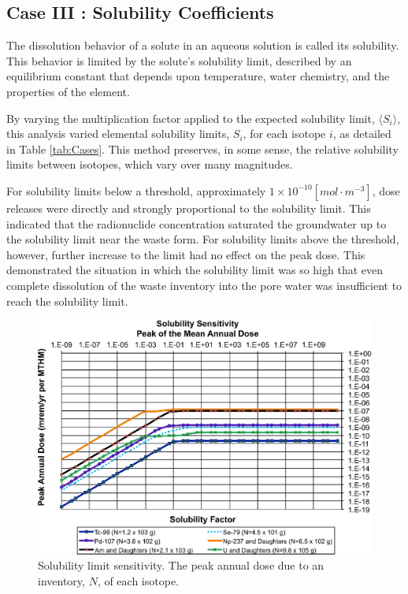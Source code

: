 
\subsection{Case III : Solubility Coefficients}

The dissolution behavior of a solute in an aqueous solution is called its 
solubility. This behavior is limited by the solute's solubility limit, described  
by an equilibrium constant that depends upon temperature, water chemistry, and 
the properties of the element. 

By varying the multiplication factor applied to the expected solubility limit, 
$\langle S_i\rangle$, this analysis varied elemental solubility limits, $S_i$, 
for each isotope $i$, as detailed in Table \ref{tab:Cases}.
This method preserves, in some sense, the relative solubility 
limits between isotopes, which vary over many magnitudes.

For solubility limits below a threshold, approximately 
$1\times10^{-10}[mol\cdot m^{-3}]$, dose releases were directly 
and strongly proportional to the solubility limit. This indicated that the radionuclide 
concentration saturated the groundwater up to the solubility limit near the 
waste form.  For solubility limits above the threshold, however, further 
increase to the limit had no effect on the peak dose. This demonstrated the 
situation in which the solubility limit was so high that even complete 
dissolution of the waste inventory into the pore water was insufficient to reach 
the solubility limit.

\begin{figure}[ht]
  \centering
  \includegraphics[width=\linewidth]{solubility.eps}
  \caption{Solubility limit sensitivity. The peak annual dose due to an 
  inventory, 
  $N$, of each isotope.}
  \label{fig:SolSum}
\end{figure}
